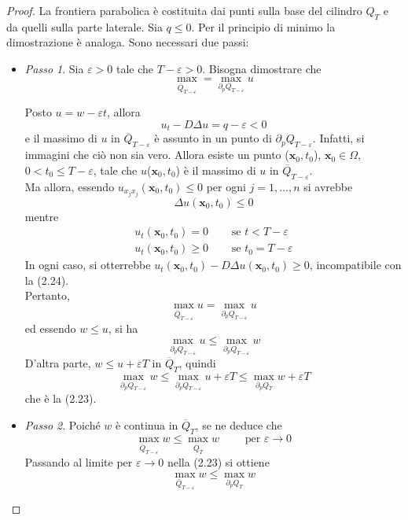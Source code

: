 \documentclass[a4paper,12pt, draft]{article}
\theoremstyle{break}
\let\epsilon\varepsilon
\numberwithin{equation}{section}
\begin{document}
\begin{proof}
La frontiera parabolica è costituita dai punti sulla base del cilindro $Q_T$ e da quelli sulla parte laterale. Sia $q \leq 0$. Per il principio di minimo la dimostrazione è analoga. Sono necessari due passi:
\begin{itemize}
\item \textit{Passo 1}. Sia $\epsilon > 0$ tale che $T - \epsilon > 0$. Bisogna dimostrare che
\begin{equation}
\max_{\overline{Q}_{T-\epsilon}} = \max_{\partial_p Q_{T-\epsilon}}u
\end{equation}

Posto $u = w- \epsilon t$, allora
\begin{equation}
u_t - D\Delta u = q -\epsilon < 0
\end{equation}
e il massimo di $u$ in $\overline{Q}_{T- \epsilon}$ è assunto in un punto di $\partial_p Q_{T-\epsilon}$. Infatti, si immagini che ciò non sia vero. Allora esiste un punto ($\bm{x}_0, t_0$), $\bm{x}_0 \in \Omega$, $0 < t_0 \leq T - \epsilon$, tale che $u$($\bm{x}_0, t_0$) è il massimo di $u$ in $\overline{Q}_{T-\epsilon}$. \\
Ma allora, essendo $u_{x_j x_j} (\bm{x}_0, t_0) \leq 0$ per ogni $j=1, \ldots, n$ si avrebbe
$$
\Delta u (\bm{x}_0, t_0) \leq 0
$$ 
mentre
$$
\begin{array}{ll}
u_t(\bm{x}_0,t_0) = 0 &\quad \mbox{ se } t < T-\epsilon \\
u_t(\bm{x}_0, t_0) \geq 0 &\quad \mbox{ se } t_0 = T-\epsilon
\end{array}
$$
In ogni caso, si otterrebbe $u_t(\bm{x}_0, t_0) - D\Delta u (\bm{x}_0, t_0) \geq 0$, incompatibile con la (2.24). \\
Pertanto,
$$\max_{\overline{Q}_{T - \epsilon}} u = \max_{\partial_p Q_{T-\epsilon}} u$$
ed essendo $w \leq u$, si ha
$$
\max_{\partial_p Q_{T-\epsilon}}u \leq \max_{\partial_p Q_{T-\epsilon}}w
$$
D'altra parte, $w \leq u + \epsilon T$ in $\overline{Q}_T$, quindi 
$$
\max_{\partial_p Q_{T-\epsilon}}w \leq \max_{\partial_p Q_{T-\epsilon}}u + \epsilon T \leq \max_{\partial_p Q_{T}}w + \epsilon T
$$
che è la (2.23).
\item \textit{Passo 2}. Poiché $w$ è continua in $\overline{Q}_T$, se ne deduce che 
$$
\max_{\overline{Q}_{T-\epsilon}} w \leq \max_{\overline{Q}_T} w \qquad \mbox{ per } \epsilon \to 0
$$
Passando al limite per $\epsilon \to 0$ nella (2.23) si ottiene
$$
\max_{\overline{Q}_{T-\epsilon}}w \leq \max_{\partial_p Q_T} w
$$
\end{itemize}
\end{proof}
\end{document}
